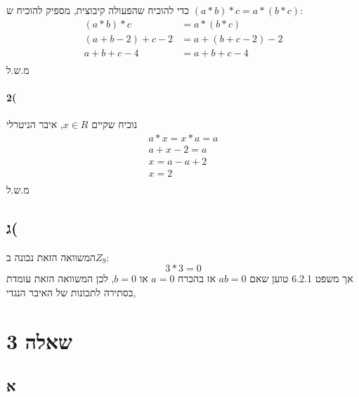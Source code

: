 \documentclass{article}
\begin{document}
כדי להוכיח שהפעולה קיבוצית, מספיק להוכיח ש $(a*b)*c = a*(b*c)$: 
\begin{align*}
  (a*b)*c &= a*(b*c)\\
  (a+b-2)+c-2 &= a+(b+c-2)-2 \\
  a+b+c-4 &= a+b+c-4 \\
\end{align*}
מ.ש.ל\\


\paragraph{2(}
נוכיח שקיים $x \in R$, איבר הניטרלי
\begin{align*}
  a*x = x*a = a\\
  a+x-2 = a\\
  x = a -a + 2\\
  x = 2\\
\end{align*}
מ.ש.ל\\


\subsection{ג(}
המשוואה הזאת נכונה ב$Z_9$:
\begin{equation*}
  3*3 = 0
\end{equation*}
אך משפט 6.2.1 טוען שאם $ab=0$ אז בהכרח $a=0$ או $b=0$, לכן המשוואה הזאת עומדת בסתירה לתכונות של האיבר הנגדי, 


\section{שאלה 3}
\subsection{א}
  
\end{document}
